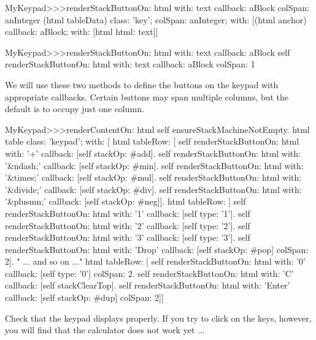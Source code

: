 \documentclass[a4paper,10pt,twoside]{book}
\begin{document}
\begin{code}{}
MyKeypad>>>renderStackButtonOn: html with: text callback: aBlock colSpan: anInteger 
	(html tableData)
		class: 'key';
		colSpan: anInteger;
		with: 
				[(html anchor)
					callback: aBlock;
					with: [html html: text]]
\end{code}


\begin{code}{}
MyKeypad>>>renderStackButtonOn: html with: text callback: aBlock 
	self 
		renderStackButtonOn: html
		with: text
		callback: aBlock
		colSpan: 1
\end{code}

We will use these two methods to define the buttons on the keypad with appropriate callbacks.
Certain buttons may span multiple columns, but the default is to occupy just one column.


\begin{code}{}
MyKeypad>>>renderContentOn: html 
  self ensureStackMachineNotEmpty.
  html table
    class: 'keypad';
    with: [
      html tableRow: [
        self renderStackButtonOn: html with: '+' callback: [self stackOp: #add].
        self renderStackButtonOn: html with: '&ndash;' callback: [self stackOp: #min].
        self renderStackButtonOn: html with: '&times;' callback: [self stackOp: #mul].
        self renderStackButtonOn: html with: '&divide;' callback: [self stackOp: #div].
        self renderStackButtonOn: html with: '&plusmn;' callback: [self stackOp: #neg]].
      html tableRow: [
        self renderStackButtonOn: html with: '1' callback: [self type: '1'].
        self renderStackButtonOn: html with: '2' callback: [self type: '2'].
        self renderStackButtonOn: html with: '3' callback: [self type: '3'].
        self renderStackButtonOn: html with: 'Drop' callback: [self stackOp: #pop]
              colSpan: 2].
" ... and so on ..."
      html tableRow: [
        self renderStackButtonOn: html with: '0' callback: [self type: '0']
              colSpan: 2.
        self renderStackButtonOn: html with: 'C' callback: [self stackClearTop].
        self renderStackButtonOn: html with: 'Enter' callback: [self stackOp: #dup]
              colSpan: 2]]

\end{code}

Check that the keypad displays properly.
If you try to click on the keys, however, you will find that the calculator does not work yet ...
\end{document}
